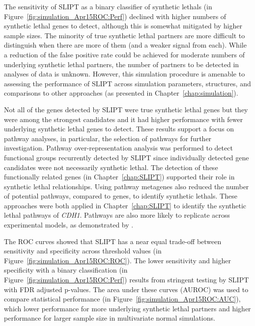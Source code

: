 The sensitivity of \gls{SLIPT} as a binary classifier of \glspl{synthetic lethal} (in Figure~\ref{fig:simulation_Apr15ROC:Perf}) declined with higher numbers of \gls{synthetic lethal} genes to detect, although this is somewhat mitigated by higher sample sizes. The minority of true \gls{synthetic lethal} partners are more difficult to distinguish when there are more of them (and a weaker  signal from each). While a reduction of the false positive rate could be achieved for moderate numbers of underlying \gls{synthetic lethal} partners, the number of partners to be detected in analyses of  data is unknown. However, this simulation procedure is amenable to assessing the performance of \gls{SLIPT} across simulation parameters,  structures, and comparisons to other approaches (as presented in Chapter~\ref{chap:simulation}).

Not all of the genes detected by \gls{SLIPT} were true \gls{synthetic lethal} genes but they were among the strongest candidates and it had higher performance with fewer underlying \gls{synthetic lethal} genes to detect. These results support a focus on pathway analyses, in particular, the selection of pathways for further investigation. Pathway over-representation analysis was performed to detect functional groups recurrently detected by \gls{SLIPT} since individually detected gene candidates were not necessarily \gls{synthetic lethal}. The detection of these functionally related genes (in Chapter~\ref{chap:SLIPT}) supported their role in \gls{synthetic lethal} relationships. Using pathway \glspl{metagene} also reduced the number of potential pathways, compared to genes, to identify \glspl{synthetic lethal}. These approaches were both applied in Chapter~\ref{chap:SLIPT} to identify the \gls{synthetic lethal} pathways of \textit{CDH1}. Pathways are also more likely to replicate across experimental models, as demonstrated by \citet{Dixon2008}.
 
The \gls{ROC} curves showed that \gls{SLIPT} has a near equal trade-off between sensitivity and specificity across threshold values (in Figure~\ref{fig:simulation_Apr15ROC:ROC}). The lower sensitivity and higher specificity with a binary classification (in Figure~\ref{fig:simulation_Apr15ROC:Perf}) results from stringent testing by \gls{SLIPT} with \gls{FDR} adjusted p-values. The area under these curves (\gls{AUROC}) was used to compare statistical performance (in Figure~\ref{fig:simulation_Apr15ROC:AUC}), which lower performance for more underlying \gls{synthetic lethal} partners and higher performance for larger sample size in multivariate normal simulations.

